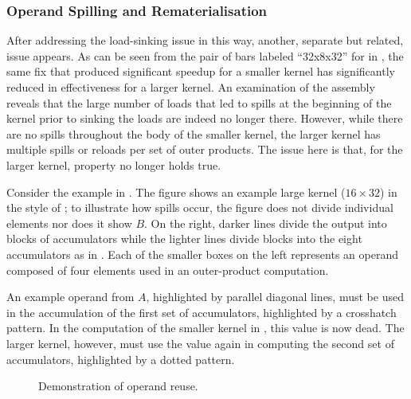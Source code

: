 \documentclass[\main/thesis.tex]{subfiles}
\begin{document}
\subsubsection{Operand Spilling and Rematerialisation}
After addressing the load-sinking issue in this way, another, separate but related, issue appears.
As can be seen from the pair of bars labeled ``32x8x32'' for  in , the same fix that produced significant speedup for a smaller kernel has significantly reduced in effectiveness for a larger kernel.
An examination of the assembly reveals that the large number of loads that led to spills at the beginning of the kernel prior to sinking the loads are indeed no longer there.
However, while there are no spills throughout the body of the smaller kernel, the larger kernel has multiple spills or reloads per set of outer products.
The issue here is that, for the larger kernel, property  no longer holds true.

Consider the example in .
The figure shows an example large kernel ($16 \times 32$) in the style of ; to illustrate how spills occur, the figure does not divide individual elements nor does it show $B$.
On the right, darker lines divide the output into blocks of accumulators while the lighter lines divide blocks into the eight accumulators as in .
Each of the smaller boxes on the left represents an operand composed of four  elements used in an outer-product computation.

An example operand from $A$, highlighted by parallel diagonal lines, must be used in the accumulation of the first set of accumulators, highlighted by a crosshatch pattern.
In the computation of the smaller kernel in , this value is now \gls{dead}.
The larger kernel, however, must use the value again in computing the second set of accumulators, highlighted by a dotted pattern.

\begin{figure}[t]
  \centering
  \caption{Demonstration of operand reuse.}
  \label{fig:opReuse}
\end{figure}
\end{document}
